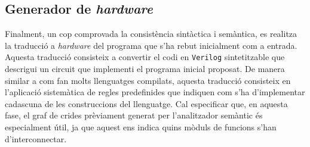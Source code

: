 \subsection{Generador de \textit{hardware}}
Finalment, un cop comprovada la consistència sintàctica i semàntica, es 
realitza la traducció a \textit{hardware} del programa que s'ha rebut 
inicialment com a entrada. Aquesta traducció consisteix a convertir el codi 
en \texttt{Verilog} sintetitzable que descrigui un circuit que implementi 
el programa inicial proposat. De manera similar a com fan molts llenguatges 
compilats, aquesta traducció consisteix en l'aplicació sistemàtica de regles 
predefinides que indiquen com s'ha d'implementar cadascuna de les construccions 
del llenguatge. Cal especificar que, en aquesta fase, el graf de crides 
prèviament generat per l'analitzador semàntic és especialment útil, ja que 
aquest ens indica quins mòduls de funcions s'han d'interconnectar.

